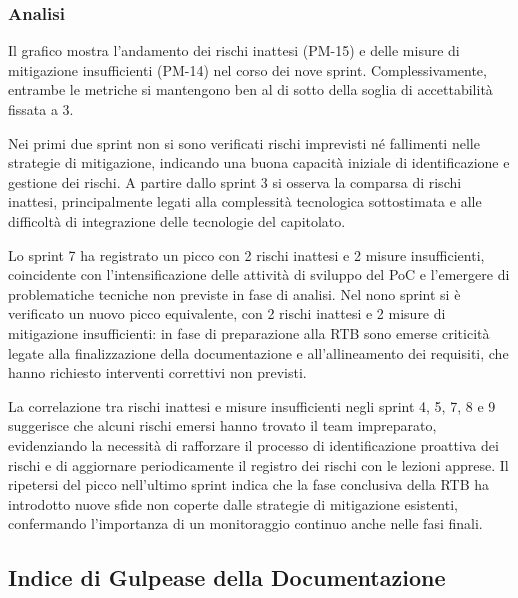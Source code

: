 \documentclass[a4paper,11pt,oneside]{scrartcl}
\begin{document}
\subsubsection*{Analisi}

Il grafico mostra l'andamento dei rischi inattesi (PM-15) e delle misure di mitigazione insufficienti (PM-14) nel corso dei nove sprint. Complessivamente, entrambe le metriche si mantengono ben al di sotto della soglia di accettabilità fissata a 3.

Nei primi due sprint non si sono verificati rischi imprevisti né fallimenti nelle strategie di mitigazione, indicando una buona capacità iniziale di identificazione e gestione dei rischi. A partire dallo sprint 3 si osserva la comparsa di rischi inattesi, principalmente legati alla complessità tecnologica sottostimata e alle difficoltà di integrazione delle tecnologie del capitolato.

Lo sprint 7 ha registrato un picco con 2 rischi inattesi e 2 misure insufficienti, coincidente con l'intensificazione delle attività di sviluppo del PoC e l'emergere di problematiche tecniche non previste in fase di analisi. Nel nono sprint si è verificato un nuovo picco equivalente, con 2 rischi inattesi e 2 misure di mitigazione insufficienti: in fase di preparazione alla RTB sono emerse criticità legate alla finalizzazione della documentazione e all'allineamento dei requisiti, che hanno richiesto interventi correttivi non previsti.

La correlazione tra rischi inattesi e misure insufficienti negli sprint 4, 5, 7, 8 e 9 suggerisce che alcuni rischi emersi hanno trovato il team impreparato, evidenziando la necessità di rafforzare il processo di identificazione proattiva dei rischi e di aggiornare periodicamente il registro dei rischi con le lezioni apprese. Il ripetersi del picco nell'ultimo sprint indica che la fase conclusiva della RTB ha introdotto nuove sfide non coperte dalle strategie di mitigazione esistenti, confermando l'importanza di un monitoraggio continuo anche nelle fasi finali.

\subsection{Indice di Gulpease della Documentazione}
\end{document}

